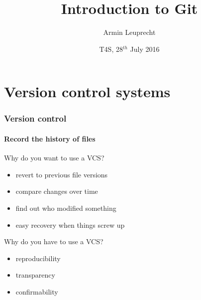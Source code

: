 \documentclass{beamer}
\title[Intro to Git]{Introduction to Git}
\author{Armin Leuprecht}
\institute
{
  Wegener Center for Climate and Global Change\\
  University of Graz
}
\date[2016-07-28]{T4S, 28$^{th}$ July 2016}
\begin{document}
\beamertemplatenavigationsymbolsempty

\begin{frame}
  \titlepage
\end{frame}

\section[VCSs]{Version control systems}
\begin{frame}
  \frametitle{Version control}
  \framesubtitle{Record the history of files}

  Why do you want to use a VCS?
  \begin{itemize}
  \item revert to previous file versions
  \item compare changes over time
  \item find out who modified something
  \item easy recovery when things screw up
  \end{itemize}

  Why do you have to use a VCS?
  \begin{itemize}
    \item reproducibility
    \item transparency
    \item confirmability
  \end{itemize}
\end{frame}
\end{document}
